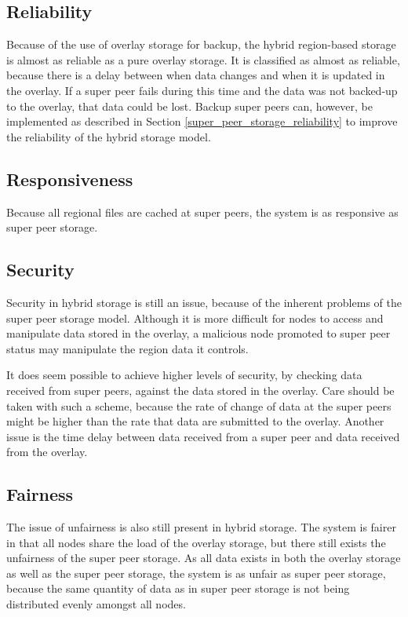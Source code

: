 \subsection{Reliability}
\label{hybrid_storage_reliability}

Because of the use of overlay storage for backup, the hybrid region-based storage is almost as reliable as a pure overlay storage. It is classified
as almost as reliable, because there is a delay between when data changes and when it is updated in the overlay. If a super peer fails during this
time and the data was not backed-up to the overlay, that data could be lost. Backup super peers can, however, be implemented as described in Section
\ref{super_peer_storage_reliability} to improve the reliability of the hybrid storage model.

\subsection{Responsiveness}

Because all regional files are cached at super peers, the system is as responsive as super peer storage.

\subsection{Security}

Security in hybrid storage is still an issue, because of the inherent problems of the super peer storage model. Although it is more difficult for
nodes to access and manipulate data stored in the overlay, a malicious node promoted to super peer status may manipulate the region data it controls.

It does seem possible to achieve higher levels of security, by checking data received from super peers, against the data stored in the overlay. Care
should be taken with such a scheme, because the rate of change of data at the super peers might be higher than the rate that data are submitted to
the overlay. Another issue is the time delay between data received from a super peer and data received from the overlay.

\subsection{Fairness}

The issue of unfairness is also still present in hybrid storage. The system is fairer in that all nodes share the load of the overlay storage, but
there still exists the unfairness of the super peer storage. As all data exists in both the overlay storage as well as the super peer storage, the
system is as unfair as super peer storage, because the same quantity of data as in super peer storage is not being distributed evenly amongst all
nodes.

